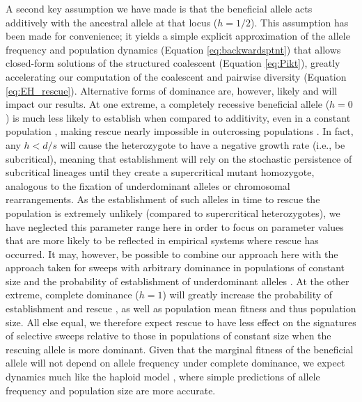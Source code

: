 \documentclass[]{article}
\begin{document}
A second key assumption we have made is that the beneficial allele acts additively with the ancestral allele at that locus ($h=1/2$).
This assumption has been made for convenience; it yields a simple explicit approximation of the allele frequency and population dynamics (Equation \ref{eq:backwardsptnt}) that allows closed-form solutions of the structured coalescent (Equation \ref{eq:Pikt}), greatly accelerating our computation of the coalescent and pairwise diversity (Equation \ref{eq:EH_rescue}).
Alternative forms of dominance are, however, likely and will impact our results.
At one extreme, a completely recessive beneficial allele ($h=0$) is much less likely to establish when compared to additivity, even in a constant population \citep[compare Equation \ref{eq:pest} with $v=1$ and $\epsilon=s/2$ to equation 15 in][]{kimura1962probability}, making rescue nearly impossible in outcrossing populations \citep{uecker2017evolutionary}.
In fact, any $h < d/s$ will cause the heterozygote to have a negative growth rate (i.e., be subcritical), meaning that establishment will rely on the stochastic persistence of subcritical lineages until they create a supercritical mutant homozygote, analogous to the fixation of underdominant alleles or chromosomal rearrangements.
As the establishment of such alleles in time to rescue the population is extremely unlikely (compared to supercritical heterozygotes), we have neglected this parameter range here in order to focus on parameter values that are more likely to be reflected in empirical systems where rescue has occurred.
It may, however, be possible to combine our approach here with the approach taken for sweeps with arbitrary dominance in populations of constant size \citep{ewing2011selective} and the probability of establishment of underdominant alleles \citep[e.g., equation 3 in][]{lande1979effective}.
At the other extreme, complete dominance ($h=1$) will greatly increase the probability of establishment and rescue \citep{uecker2017evolutionary}, as well as population mean fitness and thus population size.
All else equal, we therefore expect rescue to have less effect on the signatures of selective sweeps relative to those in populations of constant size when the rescuing allele is more dominant.
Given that the marginal fitness of the beneficial allele will not depend on allele frequency under complete dominance, we expect dynamics much like the haploid model \citep{orr2014population}, where simple predictions of allele frequency and population size are more accurate.
\end{document}

